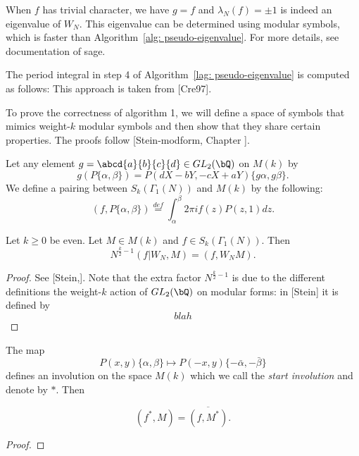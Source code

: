 \documentclass [11pt, proquest] {uwthesis}[2015/03/03]
\begin{document}
\begin{remark}
When $f$ has trivial character, we have $g = f$ and $\lambda_N(f) = \pm 1$ is indeed an eigenvalue of $W_N$. This eigenvalue can be determined using modular symbols, which is faster than 
Algorithm~\ref{alg: pseudo-eigenvalue}. For more details, see documentation of sage. 
\end{remark}

\begin{remark}
The period integral in step 4 of Algorithm~\ref{lag: pseudo-eigenvalue} is computed as follows: 
This approach is taken from [Cre97].
\end{remark}

To prove the correctness of algorithm 1, we will define a space of symbols that mimics weight-$k$ modular symbols and then show that they share certain properties. The proofs follow [Stein-modform, Chapter ]. \\ 

\begin{Definition}


\end{Definition}

Let any element $g = \abcd{a}{b}{c}{d}  \in GL_2(\bQ)$ on $M(k)$ by 
\[
	g(P\{\alpha, \beta\}) = P(dX-bY, -cX+aY)\{g\alpha,g\beta\}.
\]
We define a pairing between $S_k(\Gamma_1(N))$ and $M(k)$ by the following:
\[
	(f, P\{\alpha, \beta\}) \stackrel{def}{=} \int_{\alpha}^{\beta} 2\pi i f(z) P(z,1) dz.
\]

\begin{Lemma}
Let $k \geq 0$ be even. Let $M \in M(k)$ and $f \in S_k(\Gamma_1(N))$. Then 
\[
	N^{\frac{k}{2}-1}(f|W_N, M) = (f, W_N M).
\]
\end{Lemma}

\begin{proof}
See [Stein,]. Note that the extra factor $N^{\frac{k}{2}-1}$ is due to the different definitions the weight-$k$ action of $GL_2(\bQ)$ on modular forms: in [Stein] it is defined by 
\[
blah
\]
\end{proof}

The map  
\[
	P(x,y)\{\alpha, \beta\} \mapsto P(-x,y) \{-\bar{\alpha}, -\bar{\beta}\} 
\]
defines an involution on the space $M(k)$ which we call the {\it start involution} and denote by $*$. Then 
\begin{Lemma}
$$(f^*, M) = \overline{(f, M^*)}.$$
\end{Lemma}
\begin{proof}

\end{proof}
\end{document}
